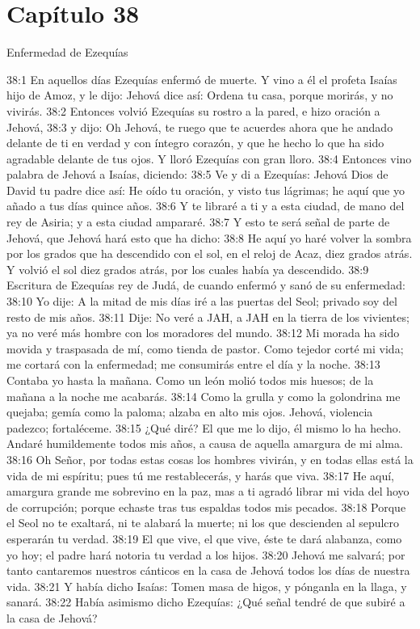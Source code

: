 \section*{Capítulo 38 }
Enfermedad de Ezequías 
 
38:1 En aquellos días Ezequías enfermó de muerte. Y vino a él el profeta Isaías hijo de Amoz, y le dijo: Jehová dice así: Ordena tu casa, porque morirás, y no vivirás. 
38:2 Entonces volvió Ezequías su rostro a la pared, e hizo oración a Jehová, 
38:3 y dijo: Oh Jehová, te ruego que te acuerdes ahora que he andado delante de ti en verdad y con íntegro corazón, y que he hecho lo que ha sido agradable delante de tus ojos. Y lloró Ezequías con gran lloro. 
38:4 Entonces vino palabra de Jehová a Isaías, diciendo: 
38:5 Ve y di a Ezequías: Jehová Dios de David tu padre dice así: He oído tu oración, y visto tus lágrimas; he aquí que yo añado a tus días quince años. 
38:6 Y te libraré a ti y a esta ciudad, de mano del rey de Asiria; y a esta ciudad ampararé. 
38:7 Y esto te será señal de parte de Jehová, que Jehová hará esto que ha dicho: 
38:8 He aquí yo haré volver la sombra por los grados que ha descendido con el sol, en el reloj de Acaz, diez grados atrás. Y volvió el sol diez grados atrás, por los cuales había ya descendido. 
38:9 Escritura de Ezequías rey de Judá, de cuando enfermó y sanó de su enfermedad: 
38:10 Yo dije: A la mitad de mis días iré a las puertas del Seol; privado soy del resto de mis años. 
38:11 Dije: No veré a JAH, a JAH en la tierra de los vivientes; ya no veré más hombre con los moradores del mundo. 
38:12 Mi morada ha sido movida y traspasada de mí, como tienda de pastor. Como tejedor corté mi vida; me cortará con la enfermedad; me consumirás entre el día y la noche. 
38:13 Contaba yo hasta la mañana. Como un león molió todos mis huesos; de la mañana a la noche me acabarás. 
38:14 Como la grulla y como la golondrina me quejaba; gemía como la paloma; alzaba en alto mis ojos. Jehová, violencia padezco; fortaléceme. 
38:15 ¿Qué diré? El que me lo dijo, él mismo lo ha hecho. Andaré humildemente todos mis años, a causa de aquella amargura de mi alma. 
38:16 Oh Señor, por todas estas cosas los hombres vivirán, y en todas ellas está la vida de mi espíritu; pues tú me restablecerás, y harás que viva. 
38:17 He aquí, amargura grande me sobrevino en la paz, mas a ti agradó librar mi vida del hoyo de corrupción; porque echaste tras tus espaldas todos mis pecados. 
38:18 Porque el Seol no te exaltará, ni te alabará la muerte; ni los que descienden al sepulcro esperarán tu verdad. 
38:19 El que vive, el que vive, éste te dará alabanza, como yo hoy; el padre hará notoria tu verdad a los hijos. 
38:20 Jehová me salvará; por tanto cantaremos nuestros cánticos en la casa de Jehová todos los días de nuestra vida. 
38:21 Y había dicho Isaías: Tomen masa de higos, y pónganla en la llaga, y sanará. 
38:22 Había asimismo dicho Ezequías: ¿Qué señal tendré de que subiré a la casa de Jehová? 
